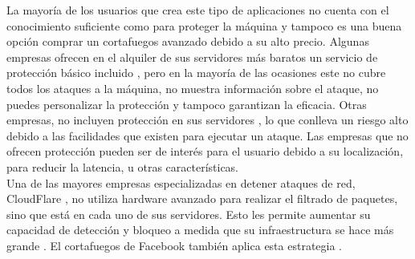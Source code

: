 La mayoría de los usuarios que crea este tipo de aplicaciones no cuenta con el conocimiento suficiente como para proteger la máquina y tampoco es una buena opción comprar un cortafuegos avanzado debido a su alto precio. Algunas empresas ofrecen en el alquiler de sus servidores más baratos un servicio de protección básico incluido \cite{mtvtonlinesas}, pero en la mayoría de las ocasiones este no cubre todos los ataques a la máquina, no muestra información sobre el ataque, no puedes personalizar la protección y tampoco garantizan la eficacia. Otras empresas, no incluyen protección en sus servidores \cite{mtvalamzena}, lo que conlleva un riesgo alto debido a las facilidades que existen para ejecutar un ataque. Las empresas que no ofrecen protección pueden ser de interés para el usuario debido a su localización, para reducir la latencia, u otras características.
\\Una de las mayores empresas especializadas en detener ataques de red, CloudFlare \cite{mtvcls}, no utiliza hardware avanzado para realizar el filtrado de paquetes, sino que está en cada uno de sus servidores. Esto les permite aumentar su capacidad de detección y bloqueo a medida que su infraestructura se hace más grande \cite{mtvDDOSCLoudflare}. El cortafuegos de Facebook también aplica esta estrategia \cite{mtvDDOSFacebook}. 